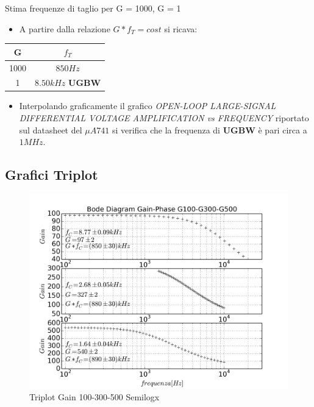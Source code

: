 \documentclass{beamer}
\begin{document}
\begin{frame}{Stima frequenze di taglio per G = 1000, G = 1}

\begin{itemize}
\item A partire dalla relazione $G*f_T = cost$ si ricava:
\end{itemize}

{
\centering
\begin{tabular}{|c|c|}
\hline G & $f_{T}$ \\ 
\hline 1000 &  $850 \si{Hz}$\\ 
\hline 1  &   $8.50 \si{kHz}$ \textbf{\textsc{UGBW}}\\ 
\hline 
\end{tabular}

} 

\begin{itemize}
\item Interpolando graficamente il grafico \textit{OPEN-LOOP LARGE-SIGNAL DIFFERENTIAL VOLTAGE AMPLIFICATION vs
FREQUENCY} riportato sul datasheet del $\mu A741$ si verifica che la frequenza di \textbf{\textsc{UGBW}} è pari circa a $1 \si{MHz}$.
\end{itemize}

\end{frame}

\subsection{Grafici Triplot}

\begin{frame}
\begin{figure}
\centering
\includegraphics[width=0.9\linewidth]{./es_9_bode_triplot}
\caption{Triplot Gain 100-300-500 Semilogx}
\label{fig:es_9_bode_triplot}
\end{figure}

\end{frame}
\end{document}
